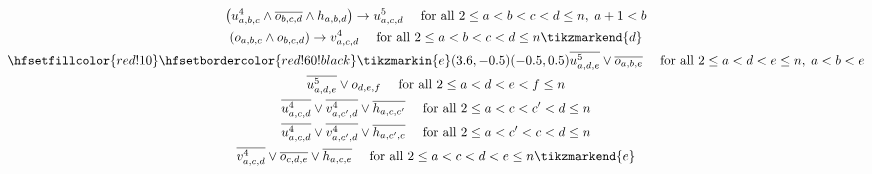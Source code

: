 \begin{figure}
\begin{spreadlines}{16pt}
\begin{gather}
  \left(\uvar_{a,b,c} \land \ov{\orvar_{b,c,d}} \land \hvar_{a,b,d}\right)\rightarrow \ufvar_{a, c, d} \quad \text{ for all } 2 \leq a < b < c < d \leq n,\; a+1<b\label{eq:constraint-8}\\
  \left(\orvar_{a, b, c} \land \orvar_{b, c, d}\right) \rightarrow \vvar_{a, c, d} \quad \text{ for all } 2 \leq a < b < c < d \leq n \tikzmarkend{d}\label{eq:constraint-9}\\
\hfsetfillcolor{red!10}
\hfsetbordercolor{red!60!black}
\tikzmarkin{e}(3.6,-0.5)(-0.5,0.5)
  \ov{\ufvar_{a,d,e}} \lor \ov{\orvar_{a, b, e}} \quad \text { for all } 2 \leq a < d < e \leq n, \; a < b < e\label{eq:constraint-10}\\
  \ov{\ufvar_{a,d,e}} \lor \orvar_{d, e, f} \quad \text { for all } 2 \leq a < d < e < f\leq n\label{eq:constraint-11}\\
  \ov{\uvar_{a,c,d}} \lor \ov{\vvar_{a, c', d}} \lor \ov{\hvar_{a,c,c'}} \quad \text{ for all } 2 \leq a < c < c' < d \leq n\label{eq:constraint-12}\\
  \ov{\uvar_{a,c,d}} \lor \ov{\vvar_{a, c', d}} \lor \ov{\hvar_{a,c',c}} \quad \text{ for all } 2 \leq a < c' < c < d \leq n\label{eq:constraint-13}\\
  \ov{\vvar_{a,c,d}} \lor \ov{\orvar_{c, d, e}} \lor \ov{\hvar_{a,c,e}} \quad \text{ for all } 2 \leq a < c < d < e \leq n\label{eq:constraint-14x}
\tikzmarkend{e}
  \end{gather}
\end{spreadlines}
\end{figure}

